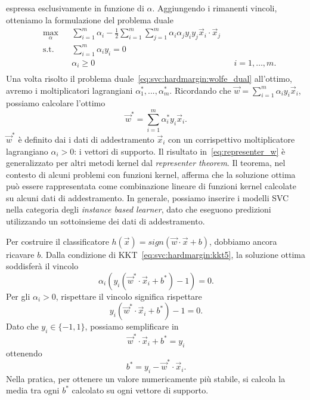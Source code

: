 espressa esclusivamente in funzione di $\alpha$.
Aggiungendo i rimanenti vincoli, otteniamo la formulazione del problema duale
\begin{equation}\label{eq:svc:hardmargin:wolfe_dual}
\begin{aligned}
& \max_{\alpha}     && \sum_{i=1}^{m}\alpha_i - \frac{1}{2}\sum_{i=1}^{m}\sum_{j=1}^{m}\alpha_i\alpha_jy_iy_j\Vec{x}_i\cdot\Vec{x}_j\\
& \textrm{s.t.}     && \sum_{i=1}^{m} \alpha_iy_i = 0 \\
&                   && \alpha_i \geq 0 && i=1,\dots,m. \\
\end{aligned}
\end{equation}
%
Una volta risolto il problema duale~\cref{eq:svc:hardmargin:wolfe_dual} all'ottimo, avremo i moltiplicatori lagrangiani $\alpha_1^*, ..., \alpha_m^*$.
Ricordando che $\Vec{w} = \sum_{i=1}^{m}\alpha_iy_i\Vec{x}_i$, possiamo calcolare l'ottimo 
\begin{equation}\label{eq:representer_w} %
\Vec{w}^* = \sum_{i=1}^{m}\alpha_i^*y_i\Vec{x}_i.
\end{equation}
$\Vec{w}^*$ è definito dai i dati di addestramento $\Vec{x}_i$ con un corrispettivo moltiplicatore lagrangiano $\alpha_i > 0$: i vettori di supporto. 
Il risultato in~\cref{eq:representer_w} è generalizzato per altri metodi kernel dal \emph{representer theorem}. Il teorema, nel contesto di alcuni problemi con funzioni kernel, afferma che la soluzione ottima può essere rappresentata come combinazione lineare di funzioni kernel calcolate su alcuni dati di addestramento. 
In generale, possiamo inserire i modelli SVC nella categoria degli \emph{instance based learner}, dato che eseguono predizioni utilizzando un sottoinsieme dei dati di addestramento.

Per costruire il classificatore $h(\Vec{x}) = sign(\Vec{w}\cdot \Vec{x} +b)$, dobbiamo ancora ricavare $b$.  Dalla condizione di KKT~\cref{eq:svc:hardmargin:kkt5}, la soluzione ottima soddisferà il vincolo 
\begin{equation*}
\alpha_i(y_i(\Vec{w}^*\cdot\Vec{x}_i+b^*)-1)=0.
\end{equation*}
Per gli $\alpha_i > 0$, rispettare il vincolo significa rispettare 
\begin{equation*}
y_i(\Vec{w}^*\cdot\Vec{x}_i+b^*) -1 = 0.
\end{equation*}
Dato che $y_i \in \{-1,1\}$, possiamo semplificare in 
\begin{equation*}
\Vec{w}^*\cdot\Vec{x}_i+b^*=y_i
\end{equation*}
ottenendo 
\begin{equation*}
b^*=y_i - \Vec{w}^*\cdot\Vec{x}_i.
\end{equation*} 
Nella pratica, per ottenere un valore numericamente più stabile, si calcola la media tra ogni $b^*$ calcolato su ogni vettore di supporto.

